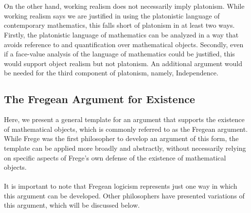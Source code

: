\documentclass[10pt,a4paper]{article}
\begin{document}
                        \\
                        \\
                        On the other hand, working realism does not necessarily imply platonism. While working realism says we are justified in using the platonistic language of contemporary mathematics, this falls short of platonism in at least two ways. Firstly, the platonistic language of mathematics can be analyzed in a way that avoids reference to and quantification over mathematical objects. Secondly, even if a face-value analysis of the language of mathematics could be justified, this would support object realism but not platonism. An additional argument would be needed for the third component of platonism, namely, Independence.\cite{sep-platonism-mathematics}\cite{Benson2006-jm}\cite{Tegmark2008-qv}
                \subsection{The Fregean Argument for Existence}
                    Here, we present a general template for an argument that supports the existence of mathematical objects, which is commonly referred to as the Fregean argument. While Frege was the first philosopher to develop an argument of this form, the template can be applied more broadly and abstractly, without necessarily relying on specific aspects of Frege's own defense of the existence of mathematical objects.
                    \\
                    \\
                    It is important to note that Fregean logicism represents just one way in which this argument can be developed. Other philosophers have presented variations of this argument, which will be discussed below.
\end{document}
